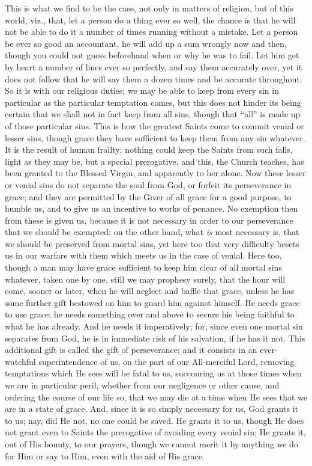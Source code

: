 This is what we find to be the case, not only in matters of
religion, but of this world, viz., that, let a person do a thing ever
so well, the chance is that he will not be able to do it a number of
times running without a mistake. Let a person be ever so good an
accountant, he will add up a sum wrongly now and then, though you
could not guess beforehand when or why he was to fail. Let him get by
heart a number of lines ever so perfectly, and say them accurately
over, yet it does not follow that he will say them a dozen times and
be accurate throughout. So it is with our religious duties; we may be
able to keep from every sin in particular as the particular temptation
comes, but this does not hinder its being certain that we shall not in
fact keep from all sins, though that ``all'' is made up of
those particular sins. This is how the greatest Saints come to commit
venial or lesser sins, though grace they have sufficient to keep them
from any sin whatever. It is the result of human frailty; nothing
could keep the Saints from such falls, light as they may be, but a
special prerogative, and this, the Church teaches, has been granted to
the Blessed Virgin, and apparently to her alone. Now these lesser or
venial sins do not separate the soul from God, or forfeit its
perseverance in grace; and they are permitted by the Giver of all
grace for a good purpose, to humble us, and to give us an incentive to
works of penance. No exemption then from these is given us, because it
is not necessary in order to our perseverance that we should be
exempted; on the other hand, what \emph{is} most necessary is, that we
should be preserved from mortal sins, yet here too that very
difficulty besets us in our warfare with them which meets us in the
case of venial. Here too, though a man may have grace sufficient to
keep him clear of all mortal sins whatever, taken one by one, still we
may prophesy surely, that the hour will come, sooner or later, when he
will neglect and baffle that grace, unless he has some further gift
bestowed on him to guard him against himself. He needs grace to use
grace; he needs something over and above to secure his being faithful
to what he has already. And he needs it imperatively; for, since even
one mortal sin separates from God, he is in immediate risk of his
salvation, if he has it not. This additional gift is called the gift
of perseverance; and it consists in an ever-watchful superintendence
of us, on the part of our All-merciful Lord, removing temptations
which He sees will be fatal to us, succouring us at those times when
we are in particular peril, whether from our negligence or other
cause, and ordering the course of our life so, that we may die at a
time when He sees that we are in a state of grace. And, since it is so
simply necessary for us, God grants it to us; nay, did He not, no one
could be saved. He grants it to us, though He does not grant even to
Saints the prerogative of avoiding every venial sin; He grants it, out
of His bounty, to our prayers, though we cannot merit it by anything
we do for Him or say to Him, even with the aid of His grace.

